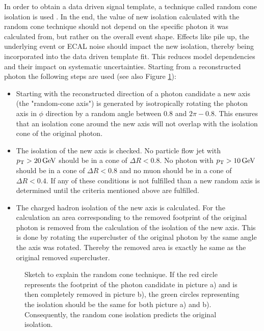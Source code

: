 In order to obtain a data driven signal template, a technique called random cone isolation is used \cite{Chatrchyan:2011qt}. In the end, the value of new isolation calculated with the random cone technique should not depend on the specific photon it was calculated from, but rather on the overall event shape. Effects like pile up, the underlying event or ECAL noise should impact the new isolation, thereby being incorporated into the data driven template fit. This reduces model dependencies and their impact on systematic uncertainties.  Starting from a reconstructed photon the following steps are used (see also Figure \ref{fig_ttg_fit_raco}):\\
\begin{itemize}
\item Starting with the reconstructed direction of a photon candidate a new axis (the "random-cone axis") is generated by isotropically rotating the photon axis in $\phi$ direction by a random angle between $0.8$ and $2 \pi - 0.8$. This ensures that an isolation cone around the new axis will not overlap with the isolation cone of the original photon.
\item The isolation of the new axis is checked. No particle flow jet with $p_{\mathrm{T}} > \SI{20}{\giga \electronvolt}$ should be in a cone of $\Delta R < 0.8$. No photon with $p_{\mathrm{T}} > \SI{10}{\giga \electronvolt}$ should be in a cone of $\Delta R < 0.8$ and no muon should be in a cone of $\Delta R < 0.4$. If any of these conditions is not fulfilled than a new random axis is determined until the criteria mentioned above are fulfilled. 
\item The charged hadron isolation of the new axis is calculated. For the calculation an area corresponding to the removed footprint of the original photon is removed from the calculation of the isolation of the new axis. This is done by rotating the supercluster of the original photon by the same angle the axis was rotated. Thereby the removed area is exactly he same as the original removed supercluster.
\end{itemize}

\begin{figure}[ht]
  \caption{Sketch to explain the random cone technique. If the red circle represents the footprint of the photon candidate in picture a) and is then completely removed in picture b), the green circles representing the isolation should be the same for both picture a) and b). Consequently, the random cone isolation predicts the original isolation. \cite{RandCone_Talk,RandCone_AN}}
  \label{fig_ttg_fit_raco}
\end{figure}

